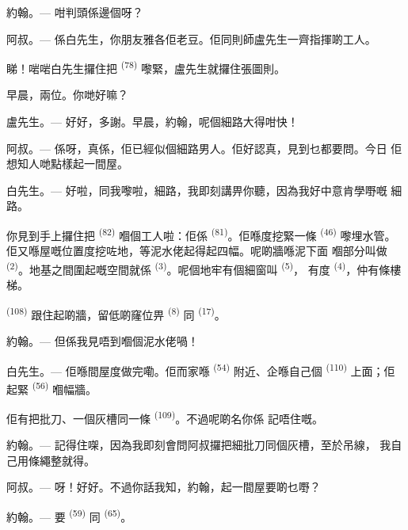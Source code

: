 \textsc{約翰}。--- 咁判頭係邊個呀？

\textsc{阿叔}。--- 係白先生，你朋友雅各佢老豆。佢同則師盧先生一齊指揮啲工人。

睇！啱啱白先生攞住把 \textsuperscript{(78)} 嚟緊，盧先生就攞住張圖則。

早晨，兩位。你哋好嘛？

\textsc{盧先生}。--- 好好，多謝。早晨，約翰，呢個細路大得咁快！

\textsc{阿叔}。--- 係呀，真係，佢已經似個細路男人。佢好認真，見到乜都要問。今日
佢想知人哋點樣起一間屋。

\VUsaut{3.0mm}

\textsc{白先生}。--- 好啦，同我嚟啦，細路，我即刻講畀你聽，因為我好中意肯學嘢嘅
細路。

你見到手上攞住把 \textsuperscript{(82)} 嗰個工人啦：佢係
 \textsuperscript{(81)}。佢喺度挖緊一條 \textsuperscript{(46)}
嚟埋水管。佢又喺屋嘅位置度挖咗地，等泥水佬起得起四幅。呢啲牆喺泥下面
嗰部分叫做 \textsuperscript{(2)}。地基之間圍起嘅空間就係
\textsuperscript{(3)}。呢個地牢有個細窗叫 \textsuperscript{(5)}，
有度 \textsuperscript{(4)}，仲有條樓梯。

 \textsuperscript{(108)} 跟住起啲牆，留低啲窿位畀
\textsuperscript{(8)} 同 \textsuperscript{(17)}。

\textsc{約翰}。--- 但係我見唔到嗰個泥水佬喎！

\textsc{白先生}。--- 佢喺間屋度做完嘞。佢而家喺 \textsuperscript{(54)}
附近、企喺自己個 \textsuperscript{(110)} 上面；佢起緊
\textsuperscript{(56)} 嗰幅牆。

佢有把批刀、一個灰槽同一條 \textsuperscript{(109)}。不過呢啲名你係
記唔住嘅。

\textsc{約翰}。--- 記得住㗎，因為我即刻會問阿叔攞把細批刀同個灰槽，至於吊線，
我自己用條繩整就得。

\VUsaut{3.0mm}
\VUsaut{3.0mm}

\textsc{阿叔}。--- 呀！好好。不過你話我知，約翰，起一間屋要啲乜嘢？

\textsc{約翰}。--- 要 \textsuperscript{(59)} 同
\textsuperscript{(65)}。

